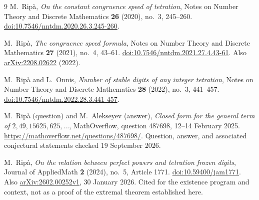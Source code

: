 \documentclass[11pt,a4paper]{article}
\theoremstyle{definition}
\begin{document}
\begin{thebibliography}{9}
M.~Rip\`a,
\emph{On the constant congruence speed of tetration},
Notes on Number Theory and Discrete Mathematics \textbf{26} (2020),
no.~3, 245--260.
\href{https://doi.org/10.7546/nntdm.2020.26.3.245-260}
{doi:10.7546/nntdm.2020.26.3.245-260}.

M.~Rip\`a,
\emph{The congruence speed formula},
Notes on Number Theory and Discrete Mathematics \textbf{27} (2021),
no.~4, 43--61.
\href{https://doi.org/10.7546/nntdm.2021.27.4.43-61}
{doi:10.7546/nntdm.2021.27.4.43-61}.
Also \href{https://arxiv.org/abs/2208.02622}{arXiv:2208.02622} (2022).

M.~Rip\`a and L.~Onnis,
\emph{Number of stable digits of any integer tetration},
Notes on Number Theory and Discrete Mathematics \textbf{28} (2022),
no.~3, 441--457.
\href{https://doi.org/10.7546/nntdm.2022.28.3.441-457}
{doi:10.7546/nntdm.2022.28.3.441-457}.

M.~Rip\`a (question) and M.~Alekseyev (answer),
\emph{Closed form for the general term of
$2,49,15625,625,\ldots$},
MathOverflow, question 487698, 12--14 February 2025.
\url{https://mathoverflow.net/questions/487698/}.
Question, answer, and associated conjectural statements checked
19 September 2026.

M.~Rip\`a,
\emph{On the relation between perfect powers and tetration frozen digits},
Journal of AppliedMath \textbf{2} (2024), no.~5, Article 1771.
\href{https://doi.org/10.59400/jam1771}{doi:10.59400/jam1771}.
Also \href{https://arxiv.org/abs/2602.00252}{arXiv:2602.00252v1},
30 January 2026.
Cited for the existence program and context, not as a proof of the
extremal theorem established here.
\end{thebibliography}
\end{document}
